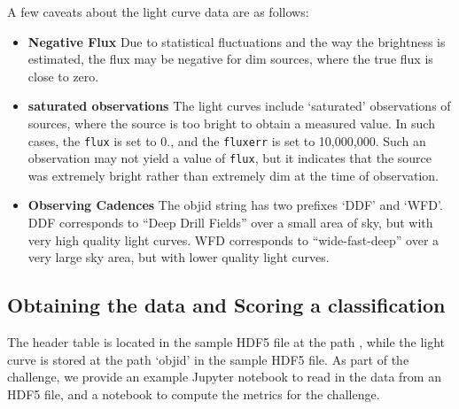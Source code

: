 \documentclass[\docopts]{\docclass}
\begin{document}
A few caveats about the light curve data are as follows:
\begin{itemize}
    \item \textbf{Negative Flux} Due to statistical fluctuations and the way the brightness is estimated, the flux may be negative for dim sources, where the true flux is close to zero. 
    \item \textbf{saturated observations} The light curves include `saturated' observations of sources, where the source is
too bright to obtain a measured value. In such cases, the {\tt flux} is set to 0., and the {\tt fluxerr} is set to 10,000,000. Such an observation may not yield a value of {\tt flux}, but it indicates that the source was extremely bright rather than extremely dim at the time of observation. 
\item \textbf{Observing Cadences} The objid string has two prefixes `DDF’ and `WFD’.  DDF corresponds to
“Deep Drill Fields” over a small area of sky, but with very high quality 
light curves. WFD corresponds to “wide-fast-deep” over a very large 
sky area, but with lower quality light curves.

\end{itemize}

\clearpage

\subsection{Obtaining the data and Scoring a classification}
The header table is located in the sample HDF5 file at the path {\header}, while the light curve is stored at the path `objid' in the sample HDF5 file. As part of the challenge, we provide an example Jupyter notebook to read in the data from an HDF5 file, and a notebook to compute the metrics for the challenge.
\end{document}
